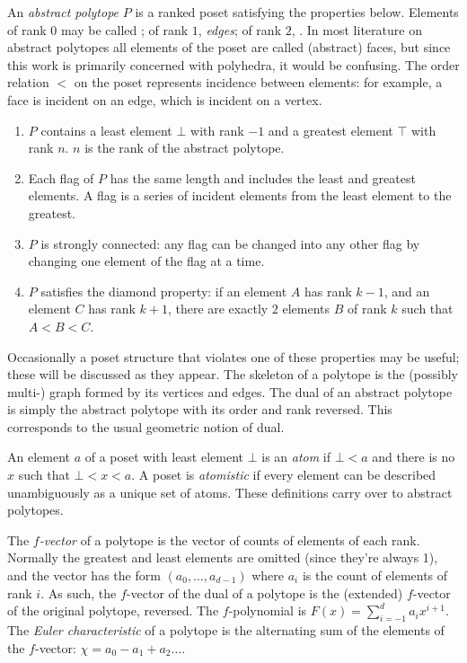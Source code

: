 \documentclass[12pt]{amsart}%
\begin{document}
An \textit{abstract polytope} $P$ is a ranked poset satisfying the properties
below. Elements of rank $0$ may be called ; of rank $1$,
\textit{edges}; of rank $2$, . In most literature on abstract
polytopes all elements of the poset are called (abstract) faces, but since this
work is primarily concerned with polyhedra, it would be confusing. The order
relation $<$ on the poset represents incidence between elements: for example,
a face is incident on an edge, which is incident on a vertex.\cite{mcmullen}
\begin{enumerate}
  \item $P$ contains a least element $\bot$ with rank $-1$ and a greatest
  element $\top$ with rank $n$. $n$ is the rank of the abstract polytope.
  \item Each flag of $P$ has the same length and includes the least and
  greatest elements. A flag is a series of incident elements from the least
  element to the greatest.
  \item $P$ is strongly connected: any flag can be changed into any other flag
  by changing one element of the flag at a time.
  \item $P$ satisfies the diamond property: if an element $A$ has rank $k-1$,
  and an element $C$ has rank $k+1$, there are exactly $2$ elements $B$ of
  rank $k$ such that $A < B < C$.
\end{enumerate}
Occasionally a poset structure that violates one of these properties may be
useful; these will be discussed as they appear. The skeleton of a polytope is
the (possibly multi-) graph formed by its vertices and edges.
The dual of an abstract polytope is simply the abstract polytope with its order
and rank reversed. This corresponds to the usual geometric notion of dual.

An element $a$ of a poset with least element $\bot$ is an \textit{atom} if
$\bot < a$ and there is no $x$ such that $\bot < x < a$. A poset is
\textit{atomistic} if every element can be described unambiguously as a unique
set of atoms. These definitions carry over to abstract polytopes.

The $f$\textit{-vector} of a polytope is the vector of counts of elements of
each rank. Normally the greatest and least elements are omitted (since they're
always 1), and the vector has the form $(a_0, \ldots, a_{d-1})$ where $a_i$ is
the count of elements of rank $i$. As such, the $f$-vector of the dual of a
polytope is the (extended) $f$-vector of the original polytope, reversed. The
$f$-polynomial is $F(x) = \sum_{i=-1}^d a_i x^{i+1}$. The
\textit{Euler characteristic} of a polytope is the alternating sum of the
elements of the $f$-vector: $\chi = a_0 - a_1 + a_2 \ldots$.
\end{document}
